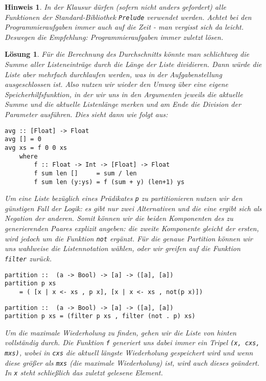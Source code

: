 \documentclass[ngerman,a4paper, 11pt]{scrartcl}
\theoremstyle{break}
\theoremstyle{nonumberplain}
\newtheorem{solution}{Lösung}
\newtheorem{hint}{Hinweis}
\begin{document}
\begin{hint}
	In der Klausur dürfen (sofern nicht anders gefordert) alle Funktionen der Standard-Bibliothek \texttt{Prelude} verwendet werden. Achtet bei den Programmieraufgaben immer auch auf die Zeit - man vergisst sich da leicht. Deswegen die Empfehlung: Programmieraufgaben immer zuletzt lösen.
\end{hint}

\begin{solution}
	Für die Berechnung des Durchschnitts könnte man schlichtweg die Summe aller Listeneinträge durch die Länge der Liste dividieren. Dann würde die Liste aber mehrfach durchlaufen werden, was in der Aufgabenstellung ausgeschlossen ist. Also nutzen wir wieder den Umweg über eine eigene Speicherhilfsfunktion, in der wir uns in den Argumenten jeweils die aktuelle Summe und die aktuelle Listenlänge merken und am Ende die Division der Parameter ausführen. Dies sieht dann wie folgt aus:
	
\begin{lstlisting}[style=haskell]
avg :: [Float] -> Float 
avg [] = 0
avg xs = f 0 0 xs
	where
		f :: Float -> Int -> [Float] -> Float
		f sum len []     = sum / len
		f sum len (y:ys) = f (sum + y) (len+1) ys 
\end{lstlisting}
	
	Um eine Liste bezüglich eines Prädikates \texttt{p} zu partitionieren nutzen wir den günstigen Fall der Logik: es gibt nur zwei Alternativen und die eine ergibt sich als Negation der anderen. Somit können wir die beiden Komponenten des zu generierenden Paares explizit angeben: die zweite Komponente gleicht der ersten, wird jedoch um die Funktion \texttt{not} ergänzt. Für die genaue Partition können wir uns wahlweise die Listennotation wählen, oder wir greifen auf die Funktion \texttt{filter} zurück.
	
\begin{lstlisting}[style=haskell]
partition ::  (a -> Bool) -> [a] -> ([a], [a]) 
partition p xs 
	= ( [x | x <- xs , p x], [x | x <- xs , not(p x)])
\end{lstlisting}

\begin{lstlisting}[style=haskell]
partition ::  (a -> Bool) -> [a] -> ([a], [a]) 
partition p xs = (filter p xs , filter (not . p) xs)
\end{lstlisting}
	
	Um die maximale Wiederholung zu finden, gehen wir die Liste von hinten vollständig durch. Die Funktion \texttt{f} generiert uns dabei immer ein Tripel \texttt{(x, cxs, mxs)}, wobei in \texttt{cxs} die aktuell längste Wiederholung gespeichert wird und wenn diese größer als \texttt{mxs} (die maximale Wiederholung) ist, wird auch dieses geändert. In \texttt{x} steht schließlich das zuletzt gelesene Element.
	

\end{solution}
\end{document}
